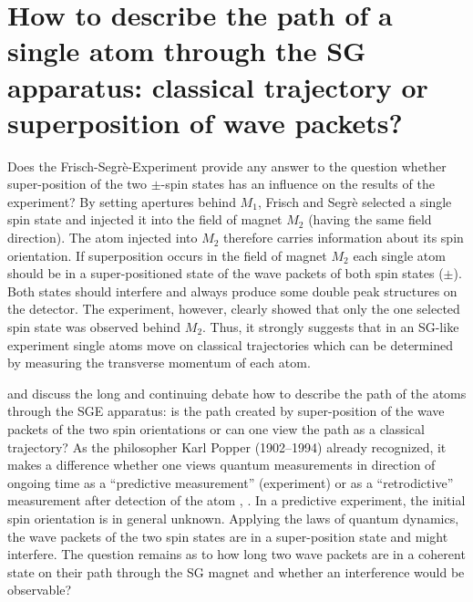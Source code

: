 \documentclass{article}
\begin{document}
\section{How to describe the path of a single atom through the SG apparatus: classical trajectory or superposition of wave packets?}

Does the Frisch-Segrè-Experiment provide any answer to the question whether super-position of the two $\pm$-spin states has an influence on the results of the experiment? By setting apertures behind $M_1$, Frisch and Segrè selected a single spin state and injected it into the field of magnet $M_2$ (having the same field direction). The atom injected into $M_2$ therefore carries information about its spin orientation. If superposition occurs in the field of magnet $M_2$ each single atom should be in a super-positioned state of the wave packets of both spin states ($\pm$). Both states should interfere and always produce some double peak structures on the detector. The experiment, however, clearly showed that only the one selected spin state was observed behind $M_2$. Thus, it strongly suggests that in an SG-like experiment single atoms move on classical trajectories which can be determined by measuring the transverse momentum of each atom.

\cite{DevereuxM2015Reduction} and \cite{WennerstroemHEtal2012experiment,WennerstroemHEtal2013measurements,WennerstroemHEtal2014Interpretation} discuss the long and continuing debate how to describe the path of the atoms through the SGE apparatus: is the path created by super-position of the wave packets of the two spin orientations or can one view the path as a classical trajectory? 
As the philosopher Karl Popper (1902--1994) already recognized, it makes a difference whether one views quantum measurements in direction of ongoing time as a ``predictive measurement'' (experiment) or as a ``retrodictive'' measurement after detection of the atom \cite[sec.~77, App.~vi]{PopperK1989Logic}, \cite[pp.~60--64]{PopperK1982Theory}. In a predictive experiment, the initial spin orientation is in general unknown. Applying the laws of quantum dynamics, the wave packets of the two spin states are in a super-position state and might interfere. The question remains as to how long two wave packets are in a coherent state on their path through the SG magnet and whether an interference would be observable? 
\end{document}
